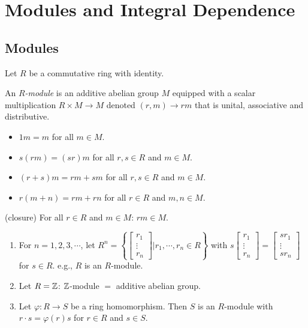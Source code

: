 \chapter{Modules and Integral Dependence}

\section*{Modules}

Let $R$ be a commutative ring with identity.

\begin{definition}
    An \emph{$R$-module} is an additive abelian group $M$ equipped with a scalar multiplication $R \times M \to M$ denoted $(r,m) \to rm$ that is unital, associative and distributive.
    \begin{itemize}
        \item $1m = m$ for all $m \in M$.
        \item $s(rm) = (sr)m$ for all $r,s \in R$ and $m \in M$.
        \item $(r+s)m = rm + sm$ for all $r,s \in R$ and $m \in M$.
        \item $r(m+n) = rm + rn$ for all $r \in R$ and $m,n \in M$.
    \end{itemize}
    \quad (closure) For all $r \in R$ and $m \in M$: $rm \in M$.
\end{definition}

\begin{example}
    \begin{enumerate}
        \item 
            For $n = 1,2,3,\cdots$, let $R^{n} = \left\{\begin{bmatrix}r_1 \\ \vdots \\ r_n\end{bmatrix}\mathrel{\Bigg |} r_1,\cdots,r_n \in R\right\}$ with $s \begin{bmatrix}r_1 \\ \vdots \\ r_n\end{bmatrix} = \begin{bmatrix}sr_1 \\ \vdots \\ sr_n\end{bmatrix}$ for $s \in R$. e.g., $R$ is an $R$-module.
        \item Let $R = \mathbb{Z}$: $\mathbb{Z}$-module $=$ additive abelian group.
        \item Let $\varphi: R \to S$ be a ring homomorphism. Then $S$ is an $R$-module with $r \cdot s = \varphi(r)s$ for $r \in R$ and $s \in S$.
    \end{enumerate}
\end{example}

